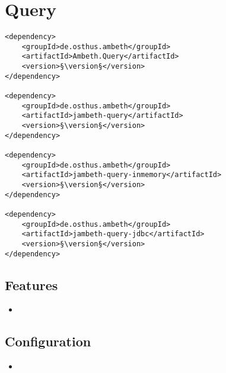 \section{Query}
\label{module:Query}
\ClearAPI
\TODO
\begin{lstlisting}[style=POM,caption={Maven modules to use \emph{Ambeth Query}}]
<dependency>
	<groupId>de.osthus.ambeth</groupId>
	<artifactId>Ambeth.Query</artifactId>
	<version>§\version§</version>
</dependency>

<dependency>
	<groupId>de.osthus.ambeth</groupId>
	<artifactId>jambeth-query</artifactId>
	<version>§\version§</version>
</dependency>

<dependency>
	<groupId>de.osthus.ambeth</groupId>
	<artifactId>jambeth-query-inmemory</artifactId>
	<version>§\version§</version>
</dependency>

<dependency>
	<groupId>de.osthus.ambeth</groupId>
	<artifactId>jambeth-query-jdbc</artifactId>
	<version>§\version§</version>
</dependency>
\end{lstlisting}
\subsection{Features}
\begin{itemize}
	\item \TODO
\end{itemize}

\subsection{Configuration}
\begin{itemize}
	\item {}
\end{itemize}
